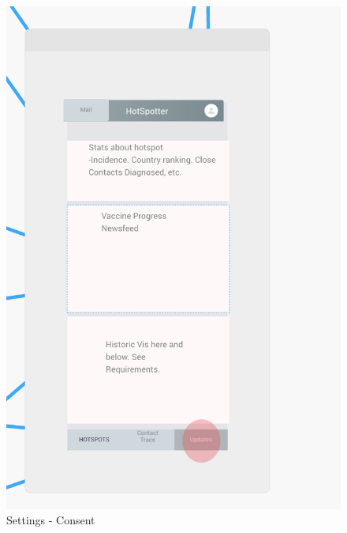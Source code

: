 \documentclass{scrreprt}
\begin{document}
\begin{figure}[H]
	\centering
	\includegraphics[page=1, width=0.9\linewidth]{COMP30830-Updates}
	\caption{Settings - Consent}
	\label{Updates}
\end{figure}
\end{document}
